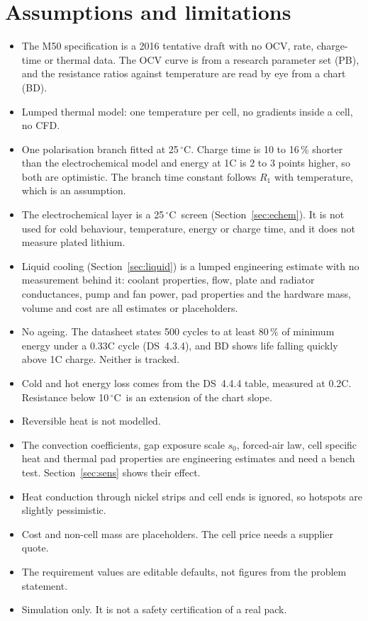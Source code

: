 \documentclass[11pt,a4paper]{article}
\newcommand{\ds}[1]{\textsc{DS}~#1}
\newcommand{\degC}{\ensuremath{{}^{\circ}\mathrm{C}}}
\begin{document}
\section{Assumptions and limitations}\label{sec:lim}
\begin{itemize}
\item The M50 specification is a 2016 tentative draft with no OCV, rate, charge-time or thermal data. The OCV curve is from a research parameter set (PB), and the resistance ratios against temperature are read by eye from a chart (BD).
\item Lumped thermal model: one temperature per cell, no gradients inside a cell, no CFD.
\item One polarisation branch fitted at 25\,\degC. Charge time is 10 to 16\,\% shorter than the electrochemical model and energy at 1C is 2 to 3 points higher, so both are optimistic. The branch time constant follows $R_1$ with temperature, which is an assumption.
\item The electrochemical layer is a 25\,\degC\ screen (Section~\ref{sec:echem}). It is not used for cold behaviour, temperature, energy or charge time, and it does not measure plated lithium.
\item Liquid cooling (Section~\ref{sec:liquid}) is a lumped engineering estimate with no measurement behind it: coolant properties, flow, plate and radiator conductances, pump and fan power, pad properties and the hardware mass, volume and cost are all estimates or placeholders.
\item No ageing. The datasheet states 500 cycles to at least 80\,\% of minimum energy under a 0.33C cycle (\ds{4.3.4}), and BD shows life falling quickly above 1C charge. Neither is tracked.
\item Cold and hot energy loss comes from the \ds{4.4.4} table, measured at 0.2C. Resistance below 10\,\degC\ is an extension of the chart slope.
\item Reversible heat is not modelled.
\item The convection coefficients, gap exposure scale $s_0$, forced-air law, cell specific heat and thermal pad properties are engineering estimates and need a bench test. Section~\ref{sec:sens} shows their effect.
\item Heat conduction through nickel strips and cell ends is ignored, so hotspots are slightly pessimistic.
\item Cost and non-cell mass are placeholders. The cell price needs a supplier quote.
\item The requirement values are editable defaults, not figures from the problem statement.
\item Simulation only. It is not a safety certification of a real pack.
\end{itemize}
\end{document}
